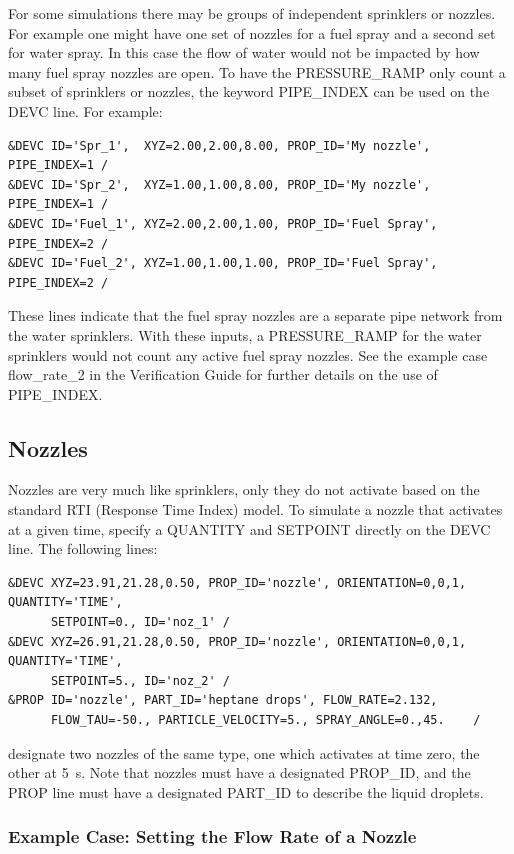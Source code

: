 \documentclass[11pt]{book}
\begin{document}
For some simulations there may be groups of independent sprinklers or nozzles.  For example one might have one set of nozzles for a fuel spray and a second set for water spray.  In this case the flow of water would not be impacted by how many fuel spray nozzles are open.  To have the {\ct PRESSURE\_RAMP} only count a subset of sprinklers or nozzles, the keyword {\ct PIPE\_INDEX} can be used on the {\ct DEVC} line. For example:
\begin{lstlisting}
&DEVC ID='Spr_1',  XYZ=2.00,2.00,8.00, PROP_ID='My nozzle',  PIPE_INDEX=1 /
&DEVC ID='Spr_2',  XYZ=1.00,1.00,8.00, PROP_ID='My nozzle',  PIPE_INDEX=1 /
&DEVC ID='Fuel_1', XYZ=2.00,2.00,1.00, PROP_ID='Fuel Spray', PIPE_INDEX=2 /
&DEVC ID='Fuel_2', XYZ=1.00,1.00,1.00, PROP_ID='Fuel Spray', PIPE_INDEX=2 /
\end{lstlisting}
These lines indicate that the fuel spray nozzles are a separate pipe network from the water sprinklers.  With these
inputs, a {\ct PRESSURE\_RAMP} for the water sprinklers would not count any active fuel spray nozzles.  See the example case
{\ct flow\_rate\_2} in the Verification Guide for further details on the use of {\ct PIPE\_INDEX}.

\subsection{Nozzles}
\label{info:nozzles}

Nozzles are very much like sprinklers, only they do not activate based on the standard RTI (Response Time Index) model. To simulate a nozzle that activates at a given time, specify a {\ct QUANTITY} and {\ct SETPOINT} directly on the {\ct DEVC} line. The following lines:
\begin{lstlisting}
&DEVC XYZ=23.91,21.28,0.50, PROP_ID='nozzle', ORIENTATION=0,0,1, QUANTITY='TIME',
      SETPOINT=0., ID='noz_1' /
&DEVC XYZ=26.91,21.28,0.50, PROP_ID='nozzle', ORIENTATION=0,0,1, QUANTITY='TIME',
      SETPOINT=5., ID='noz_2' /
&PROP ID='nozzle', PART_ID='heptane drops', FLOW_RATE=2.132,
      FLOW_TAU=-50., PARTICLE_VELOCITY=5., SPRAY_ANGLE=0.,45.    /
\end{lstlisting}
designate two nozzles of the same type, one which activates at time zero, the other at 5~s. Note that nozzles must have a designated
{\ct PROP\_ID}, and the {\ct PROP} line must have a designated {\ct PART\_ID} to describe the liquid droplets.

\subsubsection{Example Case: Setting the Flow Rate of a Nozzle}
\end{document}
